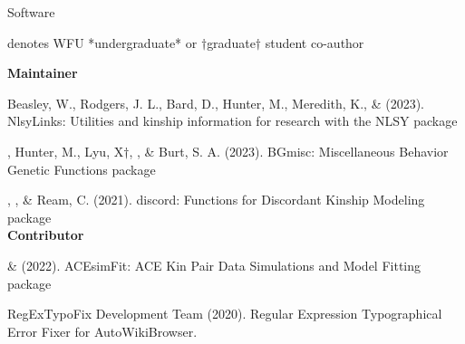 \begin{rSection}{\textrm{Software}}%
\vspace{-1mm}\begin{center}\footnotesize{denotes WFU *undergraduate* or $\dagger$graduate$\dagger$ student co-author}\end{center}\vspace{-1mm}

{\large \textbf {Maintainer}}%
\begin{etaremune}

\item  Beasley, W., Rodgers, J. L., Bard, D., Hunter, M., Meredith, K., \& \meb  (2023). NlsyLinks: Utilities and kinship information for research with the NLSY \R package 

\item\meb, Hunter, M., Lyu, X$\dagger$, \jt, \& Burt, S. A. (2023). BGmisc: Miscellaneous Behavior Genetic Functions \R package %
\item\meb, \jt, \& Ream, C. (2021). discord: Functions for Discordant Kinship Modeling \R package 
%
%
\smallskip\\
\hspace*{-8mm}\large{\bf{Contributor}}
\item \xyl  \& \meb (2022). ACEsimFit: ACE Kin Pair Data Simulations and Model Fitting \R package 


\item RegExTypoFix Development Team (2020). Regular Expression Typographical Error Fixer for Auto\allowbreak WikiBrowser. 
%
%
%
\end{etaremune}
\end{rSection}
